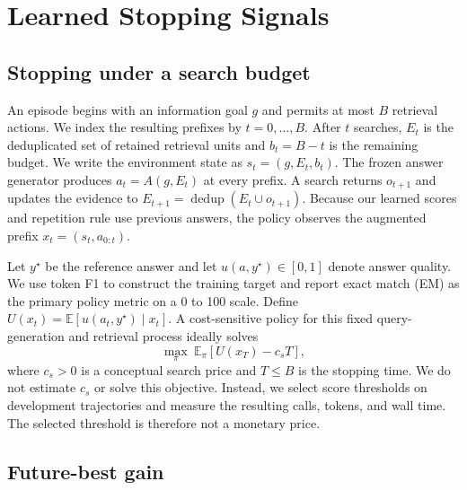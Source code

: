 \section{Learned Stopping Signals}
\label{sec:problem}

\subsection{Stopping under a search budget}

An episode begins with an information goal $g$ and permits at most $B$
retrieval actions. We index the resulting prefixes by $t=0,\ldots,B$. After
$t$ searches, $E_t$ is the
deduplicated set of retained retrieval units and $b_t=B-t$ is the remaining
budget. We write the environment state as $s_t=(g,E_t,b_t)$. The frozen answer
generator produces $a_t=A(g,E_t)$ at every prefix. A search returns
$o_{t+1}$ and updates the evidence to
$E_{t+1}=\operatorname{dedup}(E_t\cup o_{t+1})$. Because our learned scores
and repetition rule use previous answers, the policy observes the augmented
prefix $x_t=(s_t,a_{0:t})$.

Let $y^\star$ be the reference answer and let $u(a,y^\star)\in[0,1]$ denote
answer quality. We use token F1 to construct the training target and report
exact match (EM) as the primary policy metric on a 0 to 100 scale. Define
$U(x_t)=\mathbb{E}[u(a_t,y^\star)\mid x_t]$. A cost-sensitive policy for this
fixed query-generation and retrieval process ideally solves
\begin{equation}
\max_{\pi}\ \mathbb{E}_{\pi}\!\left[U(x_T)-c_sT\right],
\label{eq:objective}
\end{equation}
where $c_s>0$ is a conceptual search price and $T\le B$ is the stopping time.
We do not estimate $c_s$ or solve this objective. Instead, we select score
thresholds on development trajectories and measure the resulting calls,
tokens, and wall time. The selected threshold is therefore not a monetary
price.

\subsection{Future-best gain}
\label{sec:fbg}

